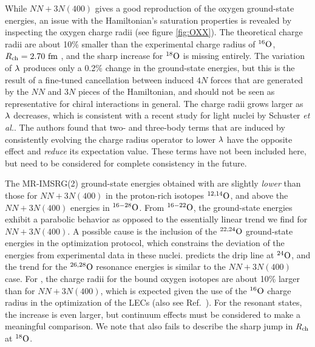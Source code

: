 While $NN+3N(400)$ gives a good reproduction of the oxygen ground-state
energies, an issue with the Hamiltonian's saturation properties is revealed
by inspecting the oxygen charge radii (see figure \ref{fig:OXX}). 
The theoretical charge radii are about 10\% smaller
than the experimental charge radius of $\nuc{O}{16}$, $\Rch=2.70\,\fm$ 
\cite{Angeli:2013rz}, and the sharp increase for $\nuc{O}{18}$ is missing 
entirely. The variation of $\lambdaSRG$ produces only a 0.2\%
change in the ground-state energies, but this is the result of
a fine-tuned cancellation between induced $4N$ forces that are
generated by the $NN$ and $3N$ pieces of the Hamiltonian, and
should not be seen as representative for chiral interactions in
general. The charge radii grows larger as $\lambdaSRG$ decreases,
which is consistent with a recent study for light nuclei 
by Schuster \emph{et al.}\cite{Schuster:2014oq}. The authors found 
that two- and three-body terms that are induced by consistently evolving
the charge radius operator to lower $\lambdaSRG$ have the opposite
effect and \emph{reduce} its expectation value. These terms have not 
been included here, but need to be considered for complete consistency
in the future.

The MR-IMSRG(2) ground-state energies obtained with \NNLOsat{} are 
slightly \emph{lower} than those for $NN\!+\!3N(400)$ in the proton-rich
isotopes $\nuc{O}{12,14}$, and above the $NN\!+\!3N(400)$ energies in 
$\nuc{O}{16-28}$. From $\nuc{O}{16-22}$, the \NNLOsat{} ground-state energies
exhibit a parabolic behavior as opposed to the essentially linear trend
we find for $NN\!+\!3N(400)$. A possible cause is the inclusion of the $\nuc{O}{22,24}$
ground-state energies in the optimization protocol, which constrains
the deviation of the energies from experimental data in these nuclei. 
\NNLOsat{} predicts the drip line at $\nuc{O}{24}$, and the trend for 
the $\nuc{O}{26,28}$ resonance energies is similar to the $NN\!+\!3N(400)$ 
case. For \NNLOsat{}, the charge radii for the bound oxygen isotopes are 
about 10\% larger than for $NN\!+\!3N(400)$, which is expected given 
the use of the $\nuc{O}{16}$ charge radius in the optimization of 
the LECs (also see Ref.~\cite{Lapoux:2016xu}). For the resonant states, 
the increase is even larger, but continuum effects must be considered to 
make a meaningful comparison. We note that \NNLOsat{} also fails to describe 
the sharp jump in $\Rch$ at $\nuc{O}{18}$.


